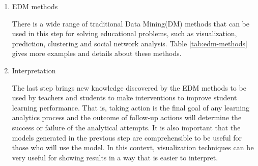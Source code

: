 \begin{enumerate}
    \item EDM methods
    
    There is a wide range of traditional Data Mining(DM) methods that can be used in this step for solving educational problems, such as visualization, prediction, clustering and social network analysis. Table \ref{tab:edm-methods} gives more examples and details about these methods.
    
    \item Interpretation
    
    The last step brings new knowledge discovered by the EDM methods to be used by teachers and students to make interventions to improve student learning performance. That is, taking action is the final goal of any learning analytics process and the outcome of follow-up actions will determine the success or failure of the analytical attempts. It is also important that the models generated in the previous step are comprehensible to be useful for those who will use the model. In this context, visualization techniques can be very useful for showing results in a way that is easier to interpret.
\end{enumerate}


